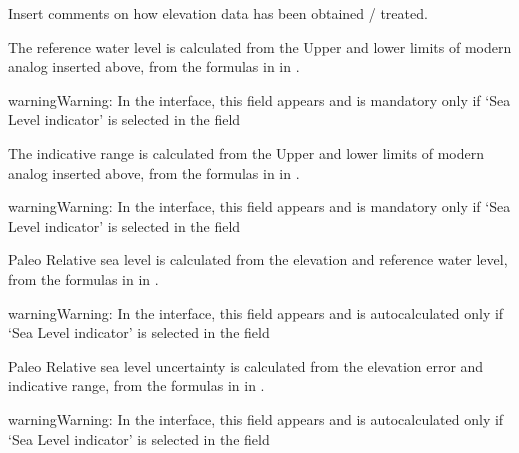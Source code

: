 \documentclass[letterpaper,10pt,english]{sphinxmanual}
\begin{document}
 \sphinxhyphen{} Insert comments on how elevation data has been obtained / treated.

 \sphinxhyphen{} The reference water level is calculated from the Upper and lower limits of modern analog inserted above, from the formulas in in .

\begin{sphinxadmonition}{warning}{Warning:}
In the interface, this field appears and is mandatory only if ‘Sea Level indicator’ is selected in the field 
\end{sphinxadmonition}

 \sphinxhyphen{} The indicative range is calculated from the Upper and lower limits of modern analog inserted above, from the formulas in in .

\begin{sphinxadmonition}{warning}{Warning:}
In the interface, this field appears and is mandatory   only if ‘Sea Level indicator’ is selected in the field 
\end{sphinxadmonition}

 \sphinxhyphen{} Paleo Relative sea level is calculated from the elevation and reference water level, from the formulas in in .

\begin{sphinxadmonition}{warning}{Warning:}
In the interface, this field appears and is auto\sphinxhyphen{}calculated only if ‘Sea Level indicator’ is selected in the field 
\end{sphinxadmonition}

 \sphinxhyphen{} Paleo Relative sea level uncertainty is calculated from the elevation error and indicative range, from the formulas in in .

\begin{sphinxadmonition}{warning}{Warning:}
In the interface, this field appears and is auto\sphinxhyphen{}calculated only if ‘Sea Level indicator’ is selected in the field 
\end{sphinxadmonition}
\end{document}

